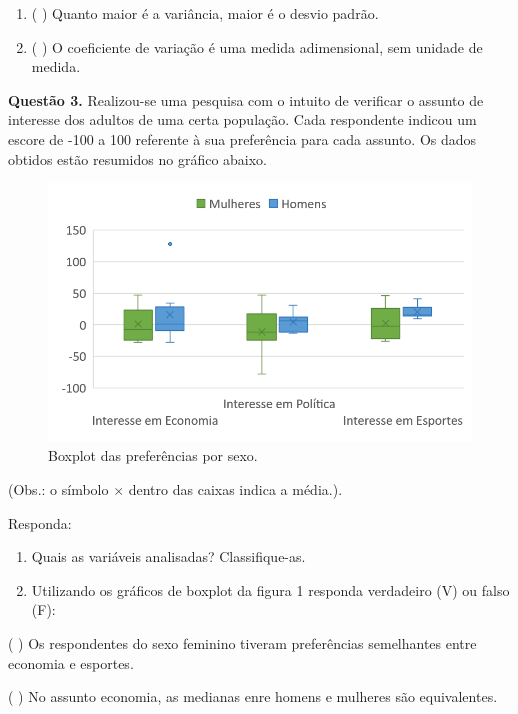 \documentclass[
]{article}
\begin{document}
\begin{enumerate}
\def\labelenumi{\alph{enumi}.}
\setcounter{enumi}{5}
\item
  ( \hspace{0,5cm} ) Quanto maior é a variância, maior é o desvio
  padrão.
\item
  ( \hspace{0,5cm} ) O coeficiente de variação é uma medida
  adimensional, sem unidade de medida.
\end{enumerate}

\newpage

\textbf{Questão 3.} Realizou-se uma pesquisa com o intuito de verificar
o assunto de interesse dos adultos de uma certa população. Cada
respondente indicou um escore de -100 a 100 referente à sua preferência
para cada assunto. Os dados obtidos estão resumidos no gráfico abaixo.

\begin{figure}[h!]
  \centering
  \includegraphics[width=0.6\linewidth]{boxplot_prova_2017_2.png} 
  \caption{Boxplot das preferências por sexo.}
  \label{Fig1}
\end{figure}

(Obs.: o símbolo \(\times\) dentro das caixas indica a média.).

Responda:

\begin{enumerate}
\def\labelenumi{\alph{enumi}.}
\item
  Quais as variáveis analisadas? Classifique-as.
\item
  Utilizando os gráficos de boxplot da figura 1 responda verdadeiro (V)
  ou falso (F):
\end{enumerate}

( \hspace{0,5cm} ) Os respondentes do sexo feminino tiveram preferências
semelhantes entre economia e esportes.

( \hspace{0,5cm} ) No assunto economia, as medianas enre homens e
mulheres são equivalentes.
\end{document}
